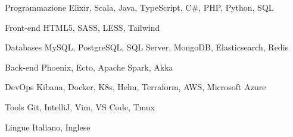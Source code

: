 \documentclass{resume} %
\begin{document}
\begin{cvSkills}


  \cvSkill
    {Programmazione}
    {Elixir, Scala, Java, TypeScript, C\#, PHP, Python, SQL}


  \cvSkill
    {Front-end}
    {HTML5, SASS, LESS, Tailwind}


  \cvSkill
    {Databases}
    {MySQL, PostgreSQL, SQL Server, MongoDB, Elasticsearch, Redis}


  \cvSkill
    {Back-end}
    {Phoenix, Ecto, Apache Spark, Akka}


  \cvSkill
    {DevOps}
    {Kibana, Docker, K8s, Helm, Terraform, AWS, Microsoft Azure}


  \cvSkill
    {Tools}
    {Git, IntelliJ, Vim, VS Code, Tmux}


  \cvSkill
    {}{}


  \cvSkill
    {Lingue}
    {Italiano, Inglese}


\end{cvSkills}



\end{document}
